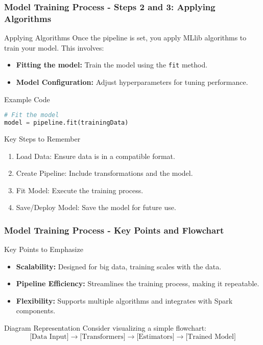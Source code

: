 \documentclass[aspectratio=169]{beamer}
\begin{document}
\begin{frame}[fragile]
    \frametitle{Model Training Process - Steps 2 and 3: Applying Algorithms}
    \begin{block}{Applying Algorithms}
        Once the pipeline is set, you apply MLlib algorithms to train your model. This involves:
    \end{block}
    \begin{itemize}
        \item \textbf{Fitting the model:} Train the model using the \texttt{fit} method.
        \item \textbf{Model Configuration:} Adjust hyperparameters for tuning performance.
    \end{itemize}
    \begin{block}{Example Code}
        \begin{lstlisting}[language=Python]
# Fit the model
model = pipeline.fit(trainingData)
        \end{lstlisting}
    \end{block}
    \begin{block}{Key Steps to Remember}
        \begin{enumerate}
            \item Load Data: Ensure data is in a compatible format.
            \item Create Pipeline: Include transformations and the model.
            \item Fit Model: Execute the training process.
            \item Save/Deploy Model: Save the model for future use.
        \end{enumerate}
    \end{block}
\end{frame}

\begin{frame}
    \frametitle{Model Training Process - Key Points and Flowchart}
    \begin{block}{Key Points to Emphasize}
        \begin{itemize}
            \item \textbf{Scalability:} Designed for big data, training scales with the data.
            \item \textbf{Pipeline Efficiency:} Streamlines the training process, making it repeatable.
            \item \textbf{Flexibility:} Supports multiple algorithms and integrates with Spark components.
        \end{itemize}
    \end{block}
    \begin{block}{Diagram Representation}
        Consider visualizing a simple flowchart:
        \[
        \text{[Data Input]} \rightarrow \text{[Transformers]} \rightarrow \text{[Estimators]} \rightarrow \text{[Trained Model]}
        \]
    \end{block}
\end{frame}
\end{document}
